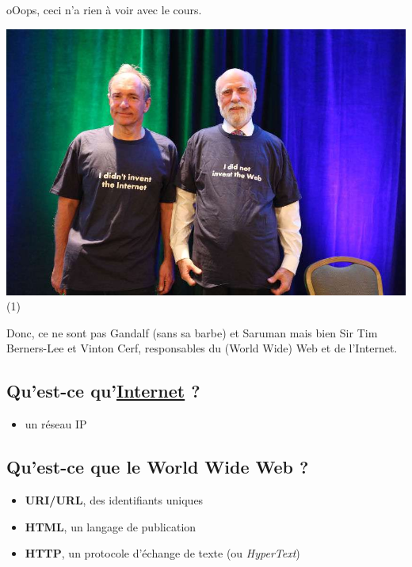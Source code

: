 oOops, ceci n'a rien à voir avec le cours.

\includegraphics{src/img/0O4A8746-large.jpg}(1)

Donc, ce ne sont pas Gandalf (sans sa barbe) et Saruman mais bien Sir
Tim Berners-Lee et Vinton Cerf, responsables du (World Wide) Web et de
l'Internet.

\hypertarget{quest-ce-quinternetitcrowd}{%
\subsection{\texorpdfstring{Qu'est-ce
qu'\href{https://www.youtube.com/watch?v=iDbyYGrswtg}{Internet}
?}{Qu'est-ce qu'Internet ?}}\label{quest-ce-quinternetitcrowd}}

\begin{itemize}
\tightlist
\item
  un réseau IP
\end{itemize}

\hypertarget{quest-ce-que-le-world-wide-web}{%
\subsection{Qu'est-ce que le World Wide Web
?}\label{quest-ce-que-le-world-wide-web}}

\begin{itemize}
\tightlist
\item
  \textbf{URI/URL}, des identifiants uniques
\item
  \textbf{HTML}, un langage de publication
\item
  \textbf{HTTP}, un protocole d'échange de texte (ou \emph{HyperText})
\end{itemize}

